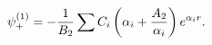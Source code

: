 \begin{equation}
\label{17}\psi _{+}^{(1)}=-\frac 1{B_2}\sum C_i\left( \alpha _i+\frac{A_2}{%
\alpha _i}\right) e^{\alpha _ir}. 
\end{equation}

